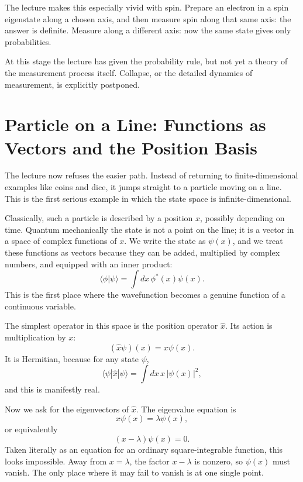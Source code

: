 The lecture makes this especially vivid with spin. Prepare an electron in a spin eigenstate along a chosen axis, and then measure spin along that same axis: the answer is definite. Measure along a different axis: now the same state gives only probabilities.

\begin{remark}
At this stage the lecture has given the probability rule, but not yet a theory of the measurement process itself. Collapse, or the detailed dynamics of measurement, is explicitly postponed.
\end{remark}

\section{Particle on a Line: Functions as Vectors and the Position Basis}

The lecture now refuses the easier path. Instead of returning to finite-dimensional examples like coins and dice, it jumps straight to a particle moving on a line. This is the first serious example in which the state space is infinite-dimensional.

Classically, such a particle is described by a position \(x\), possibly depending on time. Quantum mechanically the state is not a point on the line; it is a vector in a space of complex functions of \(x\). We write the state as \(\psi(x)\), and we treat these functions as vectors because they can be added, multiplied by complex numbers, and equipped with an inner product:
\begin{equation}
\langle \phi|\psi\rangle = \int dx\, \phi^*(x)\psi(x).
\end{equation}
This is the first place where the wavefunction becomes a genuine function of a continuous variable.

The simplest operator in this space is the position operator \(\hat x\). Its action is multiplication by \(x\):
\begin{equation}
(\hat x\psi)(x)=x\psi(x).
\end{equation}
It is Hermitian, because for any state \(\psi\),
\begin{equation}
\langle \psi|\hat x|\psi\rangle
=
\int dx\, x\, |\psi(x)|^2,
\end{equation}
and this is manifestly real.

Now we ask for the eigenvectors of \(\hat x\). The eigenvalue equation is
\begin{equation}
x\psi(x)=\lambda \psi(x),
\end{equation}
or equivalently
\begin{equation}
(x-\lambda)\psi(x)=0.
\end{equation}
Taken literally as an equation for an ordinary square-integrable function, this looks impossible. Away from \(x=\lambda\), the factor \(x-\lambda\) is nonzero, so \(\psi(x)\) must vanish. The only place where it may fail to vanish is at one single point.

